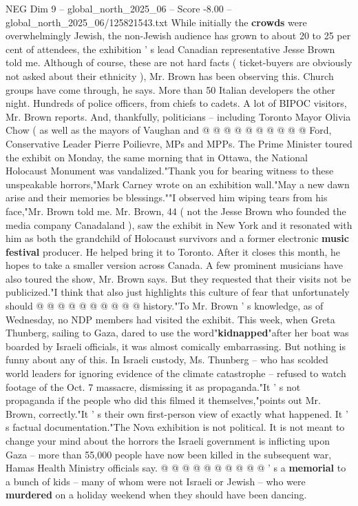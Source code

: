 \begin{textsample}{NEG Dim 9 – global\_north\_2025\_06 – Score -8.00 – global\_north\_2025\_06/125821543.txt}
While initially the \textbf{crowds} were overwhelmingly Jewish, the non-Jewish audience has grown to about 20 to 25 per cent of attendees, the exhibition ' s lead Canadian representative Jesse Brown told me.
Although of course, these are not hard facts ( ticket-buyers are obviously not asked about their ethnicity ), Mr.
Brown has been observing this.
Church groups have come through, he says.
More than 50 Italian developers the other night.
Hundreds of police officers, from chiefs to cadets.
A lot of BIPOC visitors, Mr.
Brown reports.
And, thankfully, politicians -- including Toronto Mayor Olivia Chow ( as well as the mayors of Vaughan and @ @ @ @ @ @ @ @ @ @ Ford, Conservative Leader Pierre Poilievre, MPs and MPPs.
The Prime Minister toured the exhibit on Monday, the same morning that in Ottawa, the National Holocaust Monument was vandalized."Thank you for bearing witness to these unspeakable horrors,"Mark Carney wrote on an exhibition wall."May a new dawn arise and their memories be blessings.""I observed him wiping tears from his face,"Mr.
Brown told me.
Mr.
Brown, 44 ( not the Jesse Brown who founded the media company Canadaland ), saw the exhibit in New York and it resonated with him as both the grandchild of Holocaust survivors and a former electronic \textbf{music} \textbf{festival} producer.
He helped bring it to Toronto.
After it closes this month, he hopes to take a smaller version across Canada.
A few prominent musicians have also toured the show, Mr.
Brown says.
But they requested that their visits not be publicized."I think that also just highlights this culture of fear that unfortunately should @ @ @ @ @ @ @ @ @ @ history."To Mr.
Brown ' s knowledge, as of Wednesday, no NDP members had visited the exhibit.
This week, when Greta Thunberg, sailing to Gaza, dared to use the word"\textbf{kidnapped}"after her boat was boarded by Israeli officials, it was almost comically embarrassing.
But nothing is funny about any of this.
In Israeli custody, Ms.
Thunberg -- who has scolded world leaders for ignoring evidence of the climate catastrophe -- refused to watch footage of the Oct. 7 massacre, dismissing it as propaganda."It ' s not propaganda if the people who did this filmed it themselves,"points out Mr.
Brown, correctly."It ' s their own first-person view of exactly what happened.
It ' s factual documentation."The Nova exhibition is not political.
It is not meant to change your mind about the horrors the Israeli government is inflicting upon Gaza -- more than 55,000 people have now been killed in the subsequent war, Hamas Health Ministry officials say. @ @ @ @ @ @ @ @ @ @ ' s a \textbf{memorial} to a bunch of kids -- many of whom were not Israeli or Jewish -- who were \textbf{murdered} on a holiday weekend when they should have been dancing.

\end{textsample}
